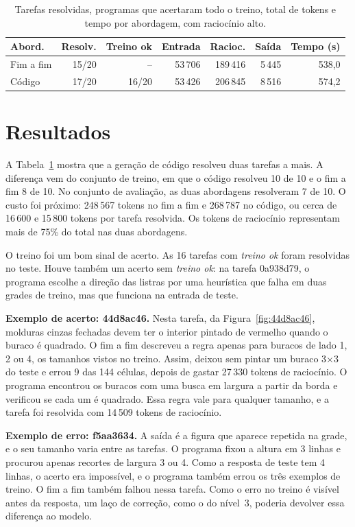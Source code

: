 \documentclass{article}
\begin{document}
\begin{table}[h]
  \centering
  \small
  \setlength{\tabcolsep}{2.2pt}
  \begin{tabular}{lrrrrrr}
    \toprule
    Abord. & Resolv. & Treino ok & Entrada & Racioc. & Saída & Tempo (s) \\
    \midrule
    Fim a fim & 15/20 & --    & 53\,706 & 189\,416 & 5\,445 & 538,0 \\
    Código    & 17/20 & 16/20 & 53\,426 & 206\,845 & 8\,516 & 574,2 \\
    \bottomrule
  \end{tabular}
  \caption{Tarefas resolvidas, programas que acertaram todo o treino, total de tokens e tempo
  por abordagem, com raciocínio alto.}
  \label{tab:resultados}
\end{table}

\section{Resultados}

A Tabela~\ref{tab:resultados} mostra que a geração de código resolveu duas tarefas a mais. A
diferença vem do conjunto de treino, em que o código resolveu 10 de 10 e o fim a fim 8 de 10.
No conjunto de avaliação, as duas abordagens resolveram 7 de 10. O custo foi próximo: 248\,567
tokens no fim a fim e 268\,787 no código, ou cerca de 16\,600 e 15\,800 tokens por tarefa
resolvida. Os tokens de raciocínio representam mais de 75\% do total nas duas abordagens.

O treino foi um bom sinal de acerto. As 16 tarefas com \emph{treino ok} foram resolvidas no
teste. Houve também um acerto sem \emph{treino ok}: na tarefa 0a938d79, o programa escolhe a
direção das listras por uma heurística que falha em duas grades de treino, mas que funciona na
entrada de teste.

\textbf{Exemplo de acerto: 44d8ac46.} Nesta tarefa, da Figura~\ref{fig:44d8ac46}, molduras
cinzas fechadas devem ter o interior pintado de vermelho quando o buraco é quadrado. O fim a fim descreveu a regra apenas para buracos de lado
1, 2 ou 4, os tamanhos vistos no treino. Assim, deixou sem pintar um buraco 3$\times$3 do teste e
errou 9 das 144 células, depois de gastar 27\,330 tokens de raciocínio. O programa encontrou os
buracos com uma busca em largura a partir da borda e verificou se cada um é quadrado. Essa regra
vale para qualquer tamanho, e a tarefa foi resolvida com 14\,509 tokens de raciocínio.

\textbf{Exemplo de erro: f5aa3634.} A saída é a figura que aparece repetida na grade, e o seu
tamanho varia entre as tarefas. O programa fixou a altura em 3 linhas e procurou apenas recortes
de largura 3 ou 4. Como a resposta de teste tem 4 linhas, o acerto era impossível, e o programa
também errou os três exemplos de treino. O fim a fim também falhou nessa tarefa. Como o erro no
treino é visível antes da resposta, um laço de correção, como o do nível~3, poderia devolver
essa diferença ao modelo.
\end{document}
